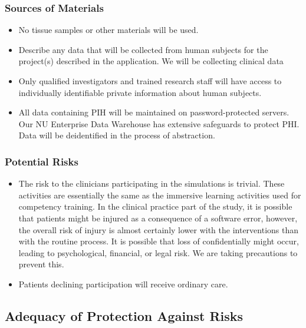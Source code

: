 \documentclass{article}
\begin{document}
\subsubsection{Sources of Materials}
\begin{itemize}
\item No tissue samples or other materials will be used.
\item Describe any data that will be collected from human subjects for the project(s) described in the application. We will be collecting clinical data
\item Only qualified investigators and trained research staff will have access to individually identifiable private information about human subjects.
\item All data containing PIH will be maintained on password-protected servers. Our NU Enterprise Data Warehouse has extensive safeguards to protect PHI. Data will be deidentified in the process of abstraction.
\end{itemize}
\subsubsection{Potential Risks}
\begin{itemize}
\item The risk to the clinicians participating in the simulations is trivial. These activities are essentially the same as the immersive learning activities used for competency training. In the clinical practice part of the study, it is possible that patients might be injured as a consequence of a software error, however, the overall risk of injury is almost certainly lower with the interventions than with the routine process. It is possible that loss of confidentially might occur, leading to psychological, financial, or legal risk. We are taking precautions to prevent this. 
\item Patients declining participation will receive ordinary care. 
\end{itemize} 
\subsection{Adequacy of Protection Against Risks}
\end{document}
